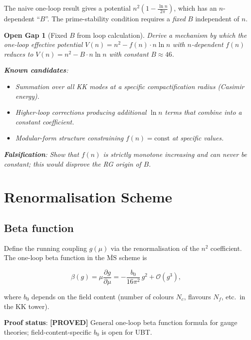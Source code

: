 \documentclass[11pt,a4paper]{article}
\newtheorem{gap}{Open Gap}
\newcommand{\proved}[1]{\textbf{[PROVED]} #1}
\begin{document}
The naive one-loop result gives a potential $n^2(1 - \frac{\ln n}{2\pi})$,
which has an $n$-dependent ``$B$''.  The prime-stability condition requires a
\emph{fixed} $B$ independent of $n$.

\begin{gap}[Fixed $B$ from loop calculation]
  \label{gap:fixedB}
  Derive a mechanism by which the one-loop effective potential
  $V(n) = n^2 - f(n)\cdot n\ln n$ with $n$-dependent $f(n)$ reduces to
  $V(n) = n^2 - B\cdot n\ln n$ with constant $B \approx 46$.

  \textbf{Known candidates}:
  \begin{itemize}
    \item Summation over all KK modes at a specific compactification radius
          (Casimir energy).
    \item Higher-loop corrections producing additional $\ln n$ terms that
          combine into a constant coefficient.
    \item Modular-form structure constraining $f(n) = \text{const}$ at
          specific values.
  \end{itemize}

  \textbf{Falsification}: Show that $f(n)$ is strictly monotone increasing
  and can never be constant; this would disprove the RG origin of $B$.
\end{gap}

\section{Renormalisation Scheme}

\subsection{Beta function}

Define the running coupling $g(\mu)$ via the renormalisation of the $n^2$
coefficient.  The one-loop beta function in the $\overline{\mathrm{MS}}$ scheme is

\[
  \beta(g) = \mu\frac{\partial g}{\partial \mu}
  = -\frac{b_0}{16\pi^2}\, g^2 + \mathcal{O}(g^3),
\]

where $b_0$ depends on the field content (number of colours $N_c$, flavours
$N_f$, etc.\ in the KK tower).

\textbf{Proof status}: \proved{General one-loop beta function formula for
gauge theories; field-content-specific $b_0$ is open for UBT.}
\end{document}

